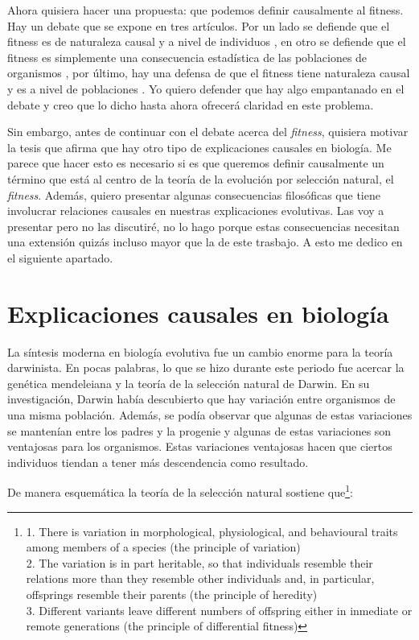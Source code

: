 Ahora quisiera hacer una propuesta: que podemos definir causalmente al fitness. Hay un debate que se expone en tres artículos. Por un lado se defiende que el fitness es de naturaleza causal y a nivel de individuos \cite{Bouchard2004}, en otro se defiende que el fitness es simplemente una consecuencia estadística de las poblaciones de organismos \cite{Walsh2002}, por último, hay una defensa de que el fitness tiene naturaleza causal y es a nivel de poblaciones \cite{Millstein2006}. Yo quiero defender que hay algo empantanado en el debate y creo que lo dicho hasta ahora ofrecerá claridad en este problema.

Sin embargo, antes de continuar con el debate acerca del \emph{fitness}, quisiera motivar la tesis que afirma que hay otro tipo de explicaciones causales en biología. Me parece que hacer esto es necesario si es que queremos definir causalmente un término que está al centro de la teoría de la evolución por selección natural, el \emph{fitness}. Además, quiero presentar algunas consecuencias filosóficas que tiene involucrar relaciones causales en nuestras explicaciones evolutivas. Las voy a presentar pero no las discutiré, no lo hago porque estas consecuencias necesitan una extensión quizás incluso mayor que la de este trasbajo. A esto me dedico en el siguiente apartado.

\section{Explicaciones causales en biología}

\noindent La síntesis moderna en biología evolutiva fue un cambio enorme para la teoría darwinista. En pocas palabras, lo que se hizo durante este periodo fue acercar la genética mendeleiana y la teoría de la selección natural de Darwin. En su investigación, Darwin había descubierto que hay variación entre organismos de una misma población. Además, se podía observar que algunas de estas variaciones se mantenían entre los padres y la progenie y algunas de estas variaciones son ventajosas para los organismos. Estas variaciones ventajosas hacen que ciertos individuos tiendan a tener más descendencia como resultado.

De manera esquemática la teoría de la selección natural sostiene que\footnote{1. There is variation in morphological, physiological, and behavioural traits among members of a species (the principle of variation) \\
2. The variation is in part heritable, so that individuals resemble their relations more than they resemble other individuals and, in particular, offsprings resemble their parents (the principle of heredity) \\
3. Different variants leave different numbers of offspring either in inmediate or remote generations (the principle of differential fitness)}:

